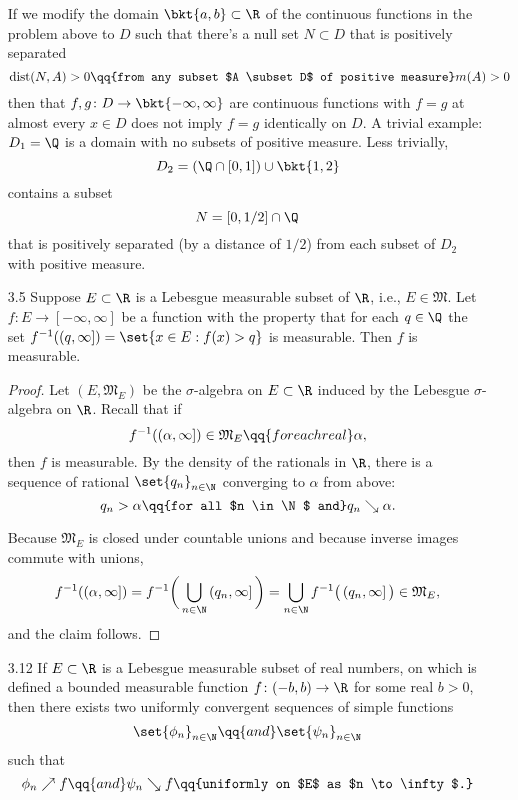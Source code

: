\documentclass[onesided]{ccg-pset}
\renewcommand{\sM}{\mathfrak{M}}
\begin{document}
\begin{enumerate}
\begin{note}
    If we modify the domain $\bkt{a,b} \subset \R$ of the continuous functions in the problem above to $D$ such that there's a null set $N \subset D$ that is positively separated \[\mathrm{dist}(N, A) > 0 \qq{from any subset $A \subset D$ of positive measure} m(A) > 0\] then that $f,g \colon D \to \bkt{-\infty, \infty}$ are continuous functions with $f = g$ at almost every $x \in D$ does not imply $f = g$ identically on $D$. A trivial example: $D_1 = \Q$ is a domain with no subsets of positive measure. Less trivially, \[D_2 = (\Q \cap [0,1]) \cup \bkt{1,2}\] contains a subset \[N = [0,1/2]\cap \Q\] that is positively separated (by a distance of $1/2$) from each subset of $D_2$ with positive measure.
\end{note}

\item[3.5] Suppose $E \subset \R$ is a Lebesgue measurable subset of $\R$, i.e., $E \in \sM$. Let $f \colon  E \to [-\infty, \infty]$ be a function with the property that for each $q \in \Q$ the set $f^{-1}((q,\infty]) = \set{x \in E : f(x) > q}$ is measurable. Then $f$ is measurable.


\begin{proof}
Let $(E, \sM_E)$ be the $\sigma$-algebra on $E \subset \R$ induced by the Lebesgue $\sigma$-algebra on $\R$. 
Recall that if \[f^{-1}((\alpha, \infty]) \in \sM_E \qq{for each real} \alpha,\] then $f$ is measurable. 
By the density of the rationals in $\R$, there is a sequence of rational $\set{q_n}_{n\in\N}$ converging to $\alpha$ from above: 
\begin{equation*}
    q_n > \alpha \qq{for all $n \in \N$ and} q_n \searrow \alpha.
\end{equation*}

Because $\sM_E$ is closed under countable unions and because inverse images commute with unions, 
\begin{equation*}
    f^{-1}(\left(\alpha, \infty\right]) = f^{-1} \bigg( \bigcup_{n \in \N} \left(q_n, \infty\right] \bigg)= \bigcup_{n \in \N} f^{-1} \big( \left(q_n, \infty\right] \big) \in \sM_E,
\end{equation*}
and the claim follows.
\end{proof}

\item[3.12] If $E \subset \R$ is a Lebesgue measurable subset of real numbers, on which is defined a bounded measurable function $f \colon (-b,b) \to \R$ for some real $b>0$, then there exists two uniformly convergent sequences of simple functions \[\set{\phi_n}_{n \in \N} \qq{and} \set{\psi_n}_{n \in \N}\] such that 
\begin{equation*}
   \phi_n \nearrow f \qq{and} \psi_n \searrow f  \qq{uniformly on $E$ as $n \to \infty$.}
\end{equation*}


\end{enumerate}
\end{document}
